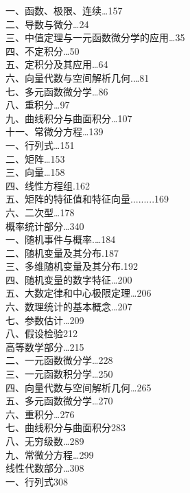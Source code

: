 \documentclass[a4paper,fleqn]{article}
\begin{document}

	一、函数、极限、连续…157 \\
	二、导数与微分…24 \\
	三、中值定理与一元函数微分学的应用…35 \\
	四、不定积分…50 \\
	五、定积分及其应用…64 \\
	六、向量代数与空间解析几何.…81 \\
	七、多元函数微分学…86\\
	八、重积分…97\\
	九、曲线积分与曲面积分…107\\
	十一、常微分方程…139\\
	一、行列式…151\\
	二、矩阵…153\\
	三、向量…158\\
	四、线性方程组.162\\
	五、矩阵的特征值和特征向量.........169\\
	六、二次型…178\\
概率统计部分…340\\
	一、随机事件与概率.…184\\
	二、随机变量及其分布.187\\
	三、多维随机变量及其分布.192\\
	四、随机变量的数字特征…200\\
	五、大数定律和中心极限定理…206\\
	六、数理统计的基本概念…207\\
	七、参数估计…209\\
	八、假设检验212\\
高等数学部分…215\\
	二、一元函数微分学…228\\
	三、一元函数积分学…250\\
	四、向量代数与空间解析几何…265\\
	五、多元函数微分学…270\\
	六、重积分…276\\
	七、曲线积分与曲面积分283\\
	八、无穷级数…289\\
	九、常微分方程…299\\
线性代数部分…308\\
	一、行列式308\\
\end{document}
